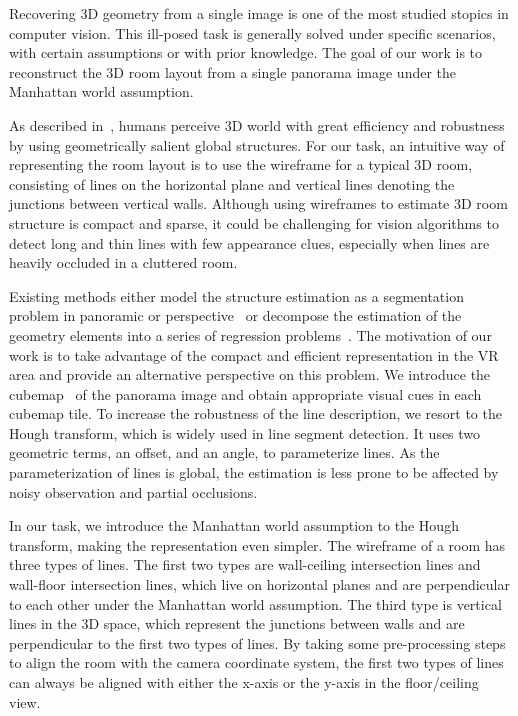 \documentclass[runningheads]{llncs}
\begin{document}
Recovering 3D geometry from a single image is one of the most studied stopics in computer vision. This ill-posed task is generally solved under specific scenarios, with certain assumptions or with prior knowledge. The goal of our work is to reconstruct the 3D room layout from a single panorama image under the Manhattan world assumption.

As described in~\cite{bertamini2013visual}, humans perceive 3D world with great efficiency and robustness by using geometrically salient global structures. For our task, an intuitive way of representing the room layout is to use the wireframe for a typical 3D room, consisting of lines on the horizontal plane and vertical lines denoting the junctions between vertical walls. Although using wireframes to estimate 3D room structure is compact and sparse, it could be challenging for vision algorithms to detect long and thin lines with few appearance clues, especially when lines are heavily occluded in a cluttered room.

Existing methods either model the structure estimation as a segmentation problem in panoramic or perspective~\cite{yang2019dula} or decompose the estimation of the geometry elements into a series of regression problems~\cite{sun2019horizonnet}.
The motivation of our work is to take advantage of the compact and efficient representation in the VR area and provide an alternative perspective on this problem. We introduce the cubemap~\cite{ng2005data} of the panorama image and obtain appropriate visual cues in each cubemap tile.
To increase the robustness of the line description, we resort to the Hough transform, which is widely used in line segment detection. It uses two geometric terms, an offset, and an angle, to parameterize lines. As the parameterization of lines is global, the estimation is less prone to be affected by noisy observation and partial occlusions.

In our task, we introduce the Manhattan world assumption to the Hough transform, making the representation even simpler. The wireframe of a room has three types of lines. The first two types are wall-ceiling intersection lines and wall-floor intersection lines, which live on horizontal planes and are perpendicular to each other under the Manhattan world assumption. The third type is vertical lines in the 3D space, which represent the junctions between walls and are perpendicular to the first two types of lines. By taking some pre-processing steps to align the room with the camera coordinate system, the first two types of lines can always be aligned with either the x-axis or the y-axis in the floor/ceiling view.
\end{document}
